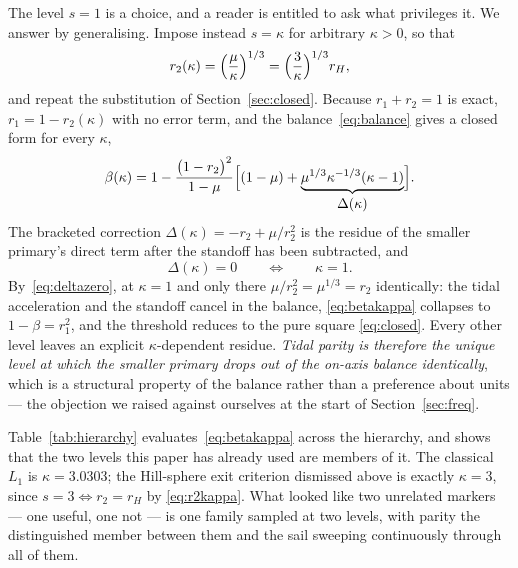 \documentclass[11pt,a4paper]{article}
\begin{document}
The level $s=1$ is a choice, and a reader is entitled to ask what privileges it.
We answer by generalising. Impose instead $s=\kappa$ for arbitrary $\kappa>0$,
so that
\begin{equation}
  r_2(\kappa) = \Bigl(\frac{\mu}{\kappa}\Bigr)^{1/3}
              = \Bigl(\frac{3}{\kappa}\Bigr)^{1/3} r_H ,
  \label{eq:r2kappa}
\end{equation}
and repeat the substitution of Section~\ref{sec:closed}. Because $r_1+r_2=1$ is
exact, $r_1=1-r_2(\kappa)$ with no error term, and the balance~\eqref{eq:balance}
gives a closed form for every $\kappa$,
\begin{equation}
  \beta(\kappa) = 1 - \frac{\bigl(1-r_2\bigr)^{2}}{1-\mu}
                  \Bigl[(1-\mu) + \underbrace{\mu^{1/3}\kappa^{-1/3}(\kappa-1)}
                  _{\textstyle \Delta(\kappa)}\Bigr] .
  \label{eq:betakappa}
\end{equation}
The bracketed correction $\Delta(\kappa)=-r_2+\mu/r_2^{2}$ is the residue of the
smaller primary's direct term after the standoff has been subtracted, and
\begin{equation}
  \Delta(\kappa)=0 \qquad\Longleftrightarrow\qquad \kappa=1 .
  \label{eq:deltazero}
\end{equation}
By~\eqref{eq:deltazero}, at $\kappa=1$ and only there
$\mu/r_2^{2}=\mu^{1/3}=r_2$ identically: the
tidal acceleration and the standoff cancel in the balance, \eqref{eq:betakappa}
collapses to $1-\beta=r_1^{2}$, and the threshold reduces to the pure square
\eqref{eq:closed}. Every other level leaves an explicit $\kappa$-dependent
residue. \emph{Tidal parity is therefore the unique level at which the smaller
primary drops out of the on-axis balance identically}, which is a structural
property of the balance rather than a preference about units --- the objection
we raised against ourselves at the start of Section~\ref{sec:freq}.

Table~\ref{tab:hierarchy} evaluates~\eqref{eq:betakappa} across the hierarchy,
and shows that the two levels this paper has already used are members of it.
The classical $L_1$ is $\kappa=3.0303$; the Hill-sphere exit criterion
dismissed above is exactly $\kappa=3$, since $s=3\Leftrightarrow r_2=r_H$ by
\eqref{eq:r2kappa}. What looked like two unrelated markers --- one useful, one
not --- is one family sampled at two levels, with parity the distinguished
member between them and the sail sweeping continuously through all of them.
\end{document}
